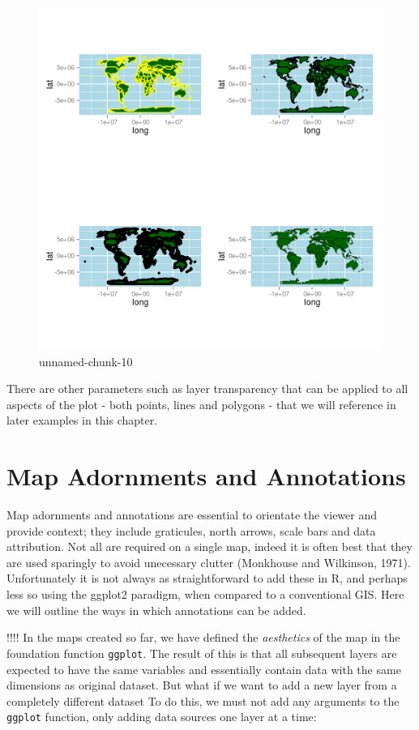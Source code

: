 \documentclass[]{article}
\makeatletter
\def\maxwidth{\ifdim\Gin@nat@width>\linewidth\linewidth
\else\Gin@nat@width\fi}
\let\Oldincludegraphics\includegraphics
\renewcommand{\includegraphics}[1]{\Oldincludegraphics[width=\maxwidth]{#1}}
\makeatother
\begin{document}
\begin{figure}[htbp]
\centering
\includegraphics{figure/unnamed-chunk-10.png}
\caption{unnamed-chunk-10}
\end{figure}

There are other parameters such as layer transparency that can be
applied to all aspects of the plot - both points, lines and polygons -
that we will reference in later examples in this chapter.

\section{Map Adornments and Annotations}

Map adornments and annotations are essential to orientate the viewer and
provide context; they include graticules, north arrows, scale bars and
data attribution. Not all are required on a single map, indeed it is
often best that they are used sparingly to avoid unecessary clutter
(Monkhouse and Wilkinson, 1971). Unfortunately it is not always as
straightforward to add these in R, and perhaps less so using the ggplot2
paradigm, when compared to a conventional GIS. Here we will outline the
ways in which annotations can be added.

!!!! In the maps created so far, we have defined the \emph{aesthetics}
of the map in the foundation function \texttt{ggplot}. The result of
this is that all subsequent layers are expected to have the same
variables and essentially contain data with the same dimensions as
original dataset. But what if we want to add a new layer from a
completely different dataset To do this, we must not add any arguments
to the \texttt{ggplot} function, only adding data sources one layer at a
time:
\end{document}
